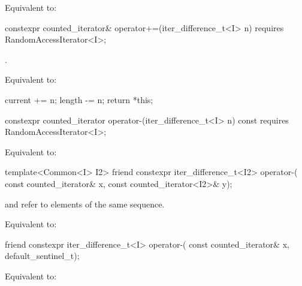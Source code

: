 \documentclass{wg21}
\begin{document}
\begin{itemdescr}
	\pnum
	\effects Equivalent to: 
\end{itemdescr}

%
\begin{itemdecl}
	constexpr counted_iterator& operator+=(iter_difference_t<I> n)
	requires RandomAccessIterator<I>;
\end{itemdecl}

\begin{itemdescr}
	\pnum
	\expects {}.
	
	\pnum
	\effects Equivalent to:
	\begin{codeblock}
		current += n;
		length -= n;
		return *this;
	\end{codeblock}
\end{itemdescr}

%
\begin{itemdecl}
	constexpr counted_iterator operator-(iter_difference_t<I> n) const
	requires RandomAccessIterator<I>;
\end{itemdecl}

\begin{itemdescr}
	\pnum
	\effects Equivalent to: 
\end{itemdescr}

%
\begin{itemdecl}
	template<Common<I> I2>
	friend constexpr iter_difference_t<I2> operator-(
	const counted_iterator& x, const counted_iterator<I2>& y);
\end{itemdecl}

\begin{itemdescr}
	\pnum
	\expects
	 and  refer to elements of the same
	sequence.
	
	\pnum
	\effects Equivalent to: 
\end{itemdescr}

%
\begin{itemdecl}
	friend constexpr iter_difference_t<I> operator-(
	const counted_iterator& x, default_sentinel_t);
\end{itemdecl}

\begin{itemdescr}
	\pnum
	\effects Equivalent to:
\end{itemdescr}
\end{document}
